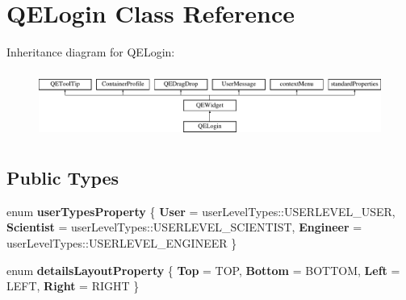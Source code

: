 \hypertarget{classQELogin}{
\section{QELogin Class Reference}
\label{classQELogin}
}
Inheritance diagram for QELogin:\begin{figure}[H]
\begin{center}
\leavevmode
\includegraphics[height=2.204725cm]{classQELogin}
\end{center}
\end{figure}
\subsection*{Public Types}
\begin{DoxyCompactItemize}
\item 
enum {\bfseries userTypesProperty} \{ {\bfseries User} =  userLevelTypes::USERLEVEL\_\-USER, 
{\bfseries Scientist} =  userLevelTypes::USERLEVEL\_\-SCIENTIST, 
{\bfseries Engineer} =  userLevelTypes::USERLEVEL\_\-ENGINEER
 \}
\item 
enum {\bfseries detailsLayoutProperty} \{ {\bfseries Top} =  TOP, 
{\bfseries Bottom} =  BOTTOM, 
{\bfseries Left} =  LEFT, 
{\bfseries Right} =  RIGHT
 \}
\end{DoxyCompactItemize}
